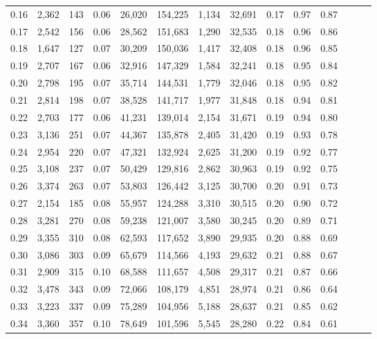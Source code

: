 \begin{tabular}{rrrrrrrrrrrrrr}
0.16 &  2,362 &  143 &  0.06 &   26,020 &  154,225 &   1,134 &  32,691 &  0.17 &  0.97 &      0.87 \\
0.17 &  2,542 &  156 &  0.06 &   28,562 &  151,683 &   1,290 &  32,535 &  0.18 &  0.96 &      0.86 \\
0.18 &  1,647 &  127 &  0.07 &   30,209 &  150,036 &   1,417 &  32,408 &  0.18 &  0.96 &      0.85 \\
0.19 &  2,707 &  167 &  0.06 &   32,916 &  147,329 &   1,584 &  32,241 &  0.18 &  0.95 &      0.84 \\
0.20 &  2,798 &  195 &  0.07 &   35,714 &  144,531 &   1,779 &  32,046 &  0.18 &  0.95 &      0.82 \\
0.21 &  2,814 &  198 &  0.07 &   38,528 &  141,717 &   1,977 &  31,848 &  0.18 &  0.94 &      0.81 \\
0.22 &  2,703 &  177 &  0.06 &   41,231 &  139,014 &   2,154 &  31,671 &  0.19 &  0.94 &      0.80 \\
0.23 &  3,136 &  251 &  0.07 &   44,367 &  135,878 &   2,405 &  31,420 &  0.19 &  0.93 &      0.78 \\
0.24 &  2,954 &  220 &  0.07 &   47,321 &  132,924 &   2,625 &  31,200 &  0.19 &  0.92 &      0.77 \\
0.25 &  3,108 &  237 &  0.07 &   50,429 &  129,816 &   2,862 &  30,963 &  0.19 &  0.92 &      0.75 \\
0.26 &  3,374 &  263 &  0.07 &   53,803 &  126,442 &   3,125 &  30,700 &  0.20 &  0.91 &      0.73 \\
0.27 &  2,154 &  185 &  0.08 &   55,957 &  124,288 &   3,310 &  30,515 &  0.20 &  0.90 &      0.72 \\
0.28 &  3,281 &  270 &  0.08 &   59,238 &  121,007 &   3,580 &  30,245 &  0.20 &  0.89 &      0.71 \\
0.29 &  3,355 &  310 &  0.08 &   62,593 &  117,652 &   3,890 &  29,935 &  0.20 &  0.88 &      0.69 \\
0.30 &  3,086 &  303 &  0.09 &   65,679 &  114,566 &   4,193 &  29,632 &  0.21 &  0.88 &      0.67 \\
0.31 &  2,909 &  315 &  0.10 &   68,588 &  111,657 &   4,508 &  29,317 &  0.21 &  0.87 &      0.66 \\
0.32 &  3,478 &  343 &  0.09 &   72,066 &  108,179 &   4,851 &  28,974 &  0.21 &  0.86 &      0.64 \\
0.33 &  3,223 &  337 &  0.09 &   75,289 &  104,956 &   5,188 &  28,637 &  0.21 &  0.85 &      0.62 \\
0.34 &  3,360 &  357 &  0.10 &   78,649 &  101,596 &   5,545 &  28,280 &  0.22 &  0.84 &      0.61 \\

\end{tabular}
